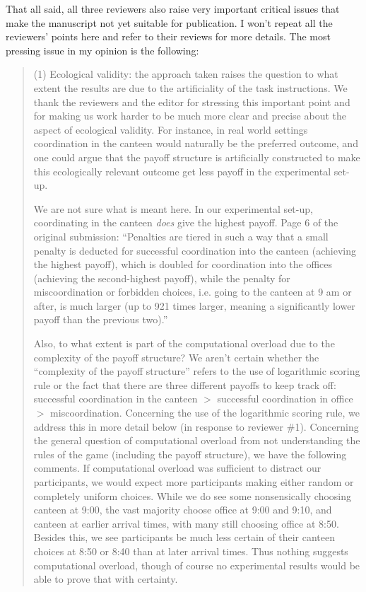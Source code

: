 \documentclass[a4paper]{article}
\newenvironment{response}{\smallskip \noindent \color{blue}}{\color{black}\smallskip}
\newenvironment{robin}{\smallskip \noindent \color{red!10!green!50!blue}}{\color{black}\smallskip}
\begin{document}
That all said, all three reviewers also raise very important critical issues that make the manuscript not yet suitable for publication. I won't repeat all the reviewers' points here and refer to their reviews for more details. The most pressing issue in my opinion is the following:
\begin{quote}
(1)    Ecological validity: the approach taken raises the question to what extent the results are due to the artificiality of the task instructions.
\begin{robin}
We thank the reviewers and the editor for stressing this important point and for making us work harder to be much more clear and precise about the aspect of ecological validity. 
\end{robin}
 For instance, in real world settings coordination in the canteen would naturally be the preferred outcome, and one could argue that the payoff structure is artificially constructed to make this ecologically relevant outcome get less payoff in the experimental set-up. 
 
\begin{response}
We are not sure what is meant here. In our experimental set-up, coordinating in the canteen \emph{does} give the highest payoff. Page 6 of the original submission: ``Penalties are tiered in such a way that a small penalty is deducted for successful coordination into the canteen (achieving the highest payoff), which is doubled for coordination into the offices (achieving the second-highest payoff), while the penalty for miscoordination or forbidden choices, i.e. going to the canteen at 9 am or after, is much larger (up to 921 times larger, meaning a significantly lower payoff than the previous two).'' 
\end{response}
 
 Also, to what extent is part of the computational overload due to the complexity of the payoff structure? 
 \begin{response}
   We aren't certain whether the ``complexity of the payoff structure'' refers to the use of logarithmic scoring rule or the fact that there are three different payoffs to keep track off: successful coordination in the canteen $>$ successful coordination in office $>$ miscoordination. Concerning the use of the logarithmic scoring rule, we address this in more detail below (in response to reviewer \#1). Concerning the general question of computational overload from not understanding the rules of the game (including the payoff structure), we have the following comments. If computational overload was sufficient to distract our participants, we would expect more participants making either random or completely uniform choices. While we do see some nonsensically choosing canteen at 9:00, the vast majority choose office at 9:00 and 9:10, and canteen at earlier arrival times, with many still choosing office at 8:50. Besides this, we see participants be much less certain of their canteen choices at 8:50 or 8:40 than at later arrival times. Thus nothing suggests computational overload, though of course no experimental results would be able to prove that with certainty. 
   

\end{response}
\end{quote}
\end{document}
